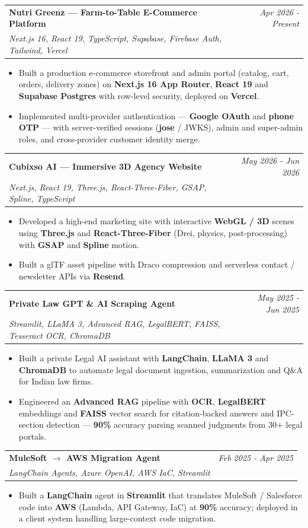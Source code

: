 \documentclass[a4paper,11pt]{article}
\makeatletter
\newcommand{\resumeProject}[4]{
\vspace{0.5mm}\item
    \begin{tabular*}{0.98\textwidth}[t]{l@{\extracolsep{\fill}}r}
        \textbf{#1} & \textit{\footnotesize{#3}} \\
        \footnotesize{\textit{#2}} & \footnotesize{#4}
    \end{tabular*}
    \vspace{-2.4mm}
}
\newcommand{\resumeItemListStart}{\begin{itemize}[leftmargin=3ex, labelsep=1mm, itemsep=0.5mm, rightmargin=0pt]}
\newcommand{\resumeItemListEnd}{\end{itemize}\vspace{-2mm}}
\makeatother
\begin{document}
\resumeProject
{Nutri Greenz --- Farm-to-Table E-Commerce Platform}
{Next.js 16, React 19, TypeScript, Supabase, Firebase Auth, Tailwind, Vercel}
{Apr 2026 - Present}
{}
\resumeItemListStart
\item Built a production e-commerce storefront and admin portal (catalog, cart, orders, delivery zones) on \textbf{Next.js 16 App Router}, \textbf{React 19} and \textbf{Supabase Postgres} with row-level security, deployed on \textbf{Vercel}.
\item Implemented multi-provider authentication --- \textbf{Google OAuth} and \textbf{phone OTP} --- with server-verified sessions (\textbf{jose} / JWKS), admin and super-admin roles, and cross-provider customer identity merge.
\resumeItemListEnd

\resumeProject
{Cubixso AI --- Immersive 3D Agency Website}
{Next.js, React 19, Three.js, React-Three-Fiber, GSAP, Spline, TypeScript}
{May 2026 - Jun 2026}
{}
\resumeItemListStart
\item Developed a high-end marketing site with interactive \textbf{WebGL / 3D} scenes using \textbf{Three.js} and \textbf{React-Three-Fiber} (Drei, physics, post-processing) with \textbf{GSAP} and \textbf{Spline} motion.
\item Built a glTF asset pipeline with Draco compression and serverless contact / newsletter APIs via \textbf{Resend}.
\resumeItemListEnd

\resumeProject
{Private Law GPT \& AI Scraping Agent}
{Streamlit, LLaMA 3, Advanced RAG, LegalBERT, FAISS, Tesseract OCR, ChromaDB}
{May 2025 - Jun 2025}
{}
\resumeItemListStart
\item Built a private Legal AI assistant with \textbf{LangChain}, \textbf{LLaMA 3} and \textbf{ChromaDB} to automate legal document ingestion, summarization and Q\&A for Indian law firms.
\item Engineered an \textbf{Advanced RAG} pipeline with \textbf{OCR}, \textbf{LegalBERT} embeddings and \textbf{FAISS} vector search for citation-backed answers and IPC-section detection --- \textbf{90\%} accuracy parsing scanned judgments from 30+ legal portals.
\resumeItemListEnd

\resumeProject
{MuleSoft $\rightarrow$ AWS Migration Agent}
{LangChain Agents, Azure OpenAI, AWS IaC, Streamlit}
{Feb 2025 - Apr 2025}
{}
\resumeItemListStart
\item Built a \textbf{LangChain} agent in \textbf{Streamlit} that translates MuleSoft / Salesforce code into \textbf{AWS} (Lambda, API Gateway, IaC) at \textbf{90\%} accuracy; deployed in a client system handling large-context code migration.
\resumeItemListEnd
\end{document}
